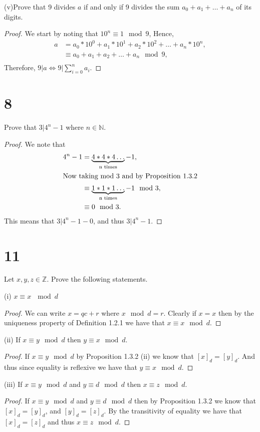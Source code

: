 \documentclass{article}
\newcommand{\N}{\mathbb{N}}
\newcommand{\Z}{\mathbb{Z}}
\begin{document}
(v)Prove that 9 divides $a$ if and only if 9 divides the sum
$a_0 +a_1 +\dots +a_n$ of its digits.
\begin{proof}
    We start by noting that $10^n \equiv 1 \mod 9$,
    Hence,
    \begin{align*}
        a & = a_0 * 10^0 + a_1*10^1 + a_2*10^2 + \dots + a_n*10^n, \\
          & \equiv a_0 + a_1 + a_2 + \dots + a_n \mod 9,           \\
    \end{align*}
    Therefore, $9 | a \iff 9| \sum_{i=0}^n a_i$.
\end{proof}

\section*{8}
Prove that $3 | 4^n - 1$ where $n \in \N$.

\begin{proof}
    We note that
    \begin{align*}
        4^n - 1 & = \underbrace{4*4*4\dots}_{\text{n times}} - 1,             \\
        \intertext{Now taking mod 3 and by Proposition 1.3.2}
                & \equiv \underbrace{1*1*1\dots}_{\text{n times}} - 1 \mod 3, \\
                & \equiv 0 \mod 3.
    \end{align*}
    This means that $3 | 4^n -1 - 0$, and thus $3 | 4^n -1$.
\end{proof}

\section*{11}
Let $x,y,z \in \Z$. Prove the following statements.

(i) $x \equiv x \ \mod d$
\begin{proof}
    We can write $x = qc + r$ where $x \mod d = r$. Clearly if $x = x$ then by
    the uniqueness property of Definition 1.2.1 we have that $x \equiv x \mod d$.
\end{proof}

(ii) If $x \equiv y \mod d$ then $y \equiv x \mod d$.
\begin{proof}
    If $x \equiv y \mod d$ by Proposition 1.3.2 (ii) we know that $[x]_d = [y]_d$.
    And thus since equality is reflexive we have that
    $y \equiv x \mod d$.
\end{proof}

(iii) If $x \equiv y \mod d$ and $y \equiv d \mod d$ then $x \equiv z \mod d$.
\begin{proof}
    If $x \equiv y \mod d$ and $y \equiv d \mod d$ then by Proposition 1.3.2 we
    know that $[x]_d = [y]_d$, and $[y]_d = [z]_d$. By the transitivity of
    equality we have that $[x]_d = [z]_d$ and thus
    $x \equiv z \mod d$.
\end{proof}
\end{document}
